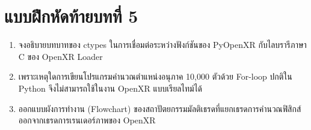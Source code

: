 \clearpage

\section*{แบบฝึกหัดท้ายบทที่ 5}

\begin{enumerate}
    \item จงอธิบายบทบาทของ ctypes ในการเชื่อมต่อระหว่างฟังก์ชันของ PyOpenXR กับไลบรารีภาษา C ของ OpenXR Loader
    \item เพราะเหตุใดการเขียนโปรแกรมคำนวณตำแหน่งอนุภาค 10,000 ตัวด้วย For-loop ปกติใน Python จึงไม่สามารถใช้ในงาน OpenXR แบบเรียลไทม์ได้
    \item ออกแบบผังการทำงาน (Flowchart) ของสถาปัตยกรรมมัลติเธรดที่แยกเธรดการคำนวณฟิสิกส์ออกจากเธรดการเรนเดอร์ภาพของ OpenXR
\end{enumerate}

